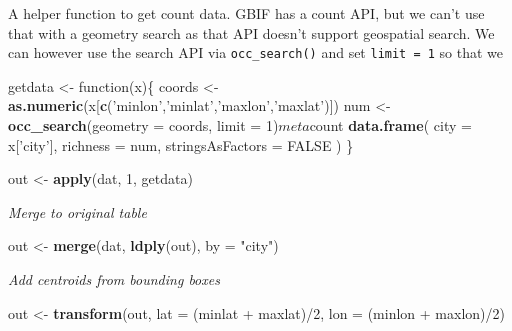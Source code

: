 \documentclass[author-year, review, 11pt]{components/elsarticle} %
\newenvironment{Shaded}{\begin{snugshade}}{\end{snugshade}}
\newcommand{\KeywordTok}[1]{\textcolor[rgb]{0.13,0.29,0.53}{\textbf{{#1}}}}
\newcommand{\DataTypeTok}[1]{\textcolor[rgb]{0.13,0.29,0.53}{{#1}}}
\newcommand{\DecValTok}[1]{\textcolor[rgb]{0.00,0.00,0.81}{{#1}}}
\newcommand{\StringTok}[1]{\textcolor[rgb]{0.31,0.60,0.02}{{#1}}}
\newcommand{\OtherTok}[1]{\textcolor[rgb]{0.56,0.35,0.01}{{#1}}}
\newcommand{\NormalTok}[1]{{#1}}
\begin{document}
A helper function to get count data. GBIF has a count API, but we can't
use that with a geometry search as that API doesn't support geospatial
search. We can however use the search API via \texttt{occ\_search()} and
set \texttt{limit = 1} so that we

\begin{Shaded}
\begin{Highlighting}[]
\NormalTok{getdata <-}\StringTok{ }\NormalTok{function(x)\{}
  \NormalTok{coords <-}\StringTok{ }\KeywordTok{as.numeric}\NormalTok{(x[}\KeywordTok{c}\NormalTok{(}\StringTok{'minlon'}\NormalTok{,}\StringTok{'minlat'}\NormalTok{,}\StringTok{'maxlon'}\NormalTok{,}\StringTok{'maxlat'}\NormalTok{)])}
  \NormalTok{num <-}\StringTok{ }\KeywordTok{occ_search}\NormalTok{(}\DataTypeTok{geometry =} \NormalTok{coords, }\DataTypeTok{limit =} \DecValTok{1}\NormalTok{)$meta$count}
  \KeywordTok{data.frame}\NormalTok{(}
    \DataTypeTok{city =} \NormalTok{x[}\StringTok{'city'}\NormalTok{], }
    \DataTypeTok{richness =} \NormalTok{num, }
    \DataTypeTok{stringsAsFactors =} \OtherTok{FALSE}
  \NormalTok{)}
\NormalTok{\}}
\end{Highlighting}
\end{Shaded}

\begin{Shaded}
\begin{Highlighting}[]
\NormalTok{out <-}\StringTok{ }\KeywordTok{apply}\NormalTok{(dat, }\DecValTok{1}\NormalTok{, getdata)}
\end{Highlighting}
\end{Shaded}

\emph{Merge to original table}

\begin{Shaded}
\begin{Highlighting}[]
\NormalTok{out <-}\StringTok{ }\KeywordTok{merge}\NormalTok{(dat, }\KeywordTok{ldply}\NormalTok{(out), }\DataTypeTok{by =} \StringTok{"city"}\NormalTok{)}
\end{Highlighting}
\end{Shaded}

\emph{Add centroids from bounding boxes}

\begin{Shaded}
\begin{Highlighting}[]
\NormalTok{out <-}\StringTok{ }\KeywordTok{transform}\NormalTok{(out, }\DataTypeTok{lat =} \NormalTok{(minlat +}\StringTok{ }\NormalTok{maxlat)/}\DecValTok{2}\NormalTok{, }\DataTypeTok{lon =} \NormalTok{(minlon +}\StringTok{ }\NormalTok{maxlon)/}\DecValTok{2}\NormalTok{)}
\end{Highlighting}
\end{Shaded}
\end{document}
